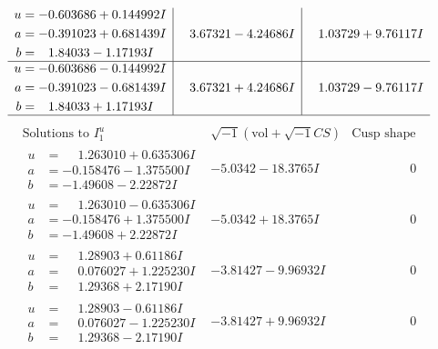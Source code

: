 \documentclass[1p]{elsarticle_modified}
\theoremstyle{definition}
\newcommand{\I}{\sqrt{-1}}
\begin{document}
$$\begin{array}{c|c|c}
\begin{aligned}
u &= -0.603686 + 0.144992 I \\
a &= -0.391023 + 0.681439 I \\
b &= \phantom{-}1.84033 - 1.17193 I\end{aligned}
 & \phantom{-}3.67321 - 4.24686 I & \phantom{-}1.03729 + 9.76117 I \\ \hline\begin{aligned}
u &= -0.603686 - 0.144992 I \\
a &= -0.391023 - 0.681439 I \\
b &= \phantom{-}1.84033 + 1.17193 I\end{aligned}
 & \phantom{-}3.67321 + 4.24686 I & \phantom{-}1.03729 - 9.76117 I\\
 \hline 
 \end{array}$$\newpage$$\begin{array}{c|c|c}  
\text{Solutions to }I^u_{1}& \I (\text{vol} + \sqrt{-1}CS) & \text{Cusp shape}\\
 \hline 
\begin{aligned}
u &= \phantom{-}1.263010 + 0.635306 I \\
a &= -0.158476 - 1.375500 I \\
b &= -1.49608 - 2.22872 I\end{aligned}
 & -5.0342 - 18.3765 I & \phantom{-0.000000 } 0 \\ \hline\begin{aligned}
u &= \phantom{-}1.263010 - 0.635306 I \\
a &= -0.158476 + 1.375500 I \\
b &= -1.49608 + 2.22872 I\end{aligned}
 & -5.0342 + 18.3765 I & \phantom{-0.000000 } 0 \\ \hline\begin{aligned}
u &= \phantom{-}1.28903 + 0.61186 I \\
a &= \phantom{-}0.076027 + 1.225230 I \\
b &= \phantom{-}1.29368 + 2.17190 I\end{aligned}
 & -3.81427 - 9.96932 I & \phantom{-0.000000 } 0 \\ \hline\begin{aligned}
u &= \phantom{-}1.28903 - 0.61186 I \\
a &= \phantom{-}0.076027 - 1.225230 I \\
b &= \phantom{-}1.29368 - 2.17190 I\end{aligned}
 & -3.81427 + 9.96932 I & \phantom{-0.000000 } 0 \\ \hline\begin{aligned}

\end{aligned}
\end{array}$$
\end{document}

